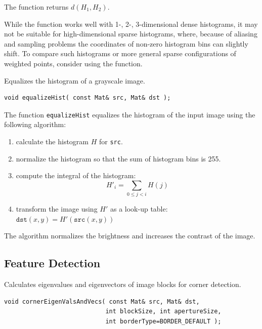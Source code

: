 The function returns $d(H_1, H_2)$.

While the function works well with 1-, 2-, 3-dimensional dense histograms, it may not be suitable for high-dimensional sparse histograms, where, because of aliasing and sampling problems the coordinates of non-zero histogram bins can slightly shift. To compare such histograms or more general sparse configurations of weighted points, consider using the  function.

\label{equalizeHist}
Equalizes the histogram of a grayscale image.

\begin{lstlisting}
void equalizeHist( const Mat& src, Mat& dst );
\end{lstlisting}
\begin{description}
\end{description}

The function \texttt{equalizeHist} equalizes the histogram of the input image using the following algorithm:

\begin{enumerate}
\item calculate the histogram $H$ for \texttt{src}.
\item normalize the histogram so that the sum of histogram bins is 255.
\item compute the integral of the histogram:
\[
H'_i = \sum_{0 \le j < i} H(j)
\]
\item transform the image using $H'$ as a look-up table: $\texttt{dst}(x,y) = H'(\texttt{src}(x,y))$
\end{enumerate}

The algorithm normalizes the brightness and increases the contrast of the image.


\subsection{Feature Detection}

\label{cornerEigenValsAndVecs}
Calculates eigenvalues and eigenvectors of image blocks for corner detection.

\begin{lstlisting}
void cornerEigenValsAndVecs( const Mat& src, Mat& dst,
                            int blockSize, int apertureSize,
                            int borderType=BORDER_DEFAULT );
\end{lstlisting}
\begin{description}
\end{description}

